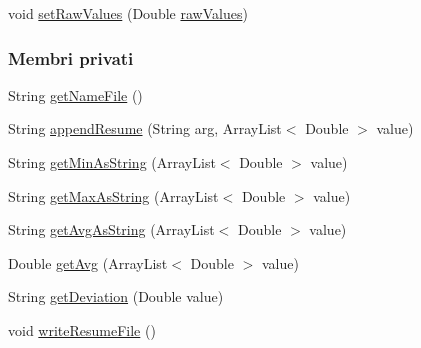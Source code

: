 \begin{DoxyCompactItemize}
\item 
void \hyperlink{classit_1_1unibo_1_1torsello_1_1bluetoothpositioning_1_1util_1_1ReportUtils_a6a65fe55f37edba3871801600cdf48f4_a6a65fe55f37edba3871801600cdf48f4}{set\+Raw\+Values} (Double \hyperlink{classit_1_1unibo_1_1torsello_1_1bluetoothpositioning_1_1util_1_1ReportUtils_adbe56bea0813a48932ef94b8b27c3314_adbe56bea0813a48932ef94b8b27c3314}{raw\+Values})
\end{DoxyCompactItemize}
\subsubsection*{Membri privati}
\begin{DoxyCompactItemize}
\item 
String \hyperlink{classit_1_1unibo_1_1torsello_1_1bluetoothpositioning_1_1util_1_1ReportUtils_a0f5823e8ff4bd5e3accc20a7313b075f_a0f5823e8ff4bd5e3accc20a7313b075f}{get\+Name\+File} ()
\item 
String \hyperlink{classit_1_1unibo_1_1torsello_1_1bluetoothpositioning_1_1util_1_1ReportUtils_ac57226bb543cd32d89c205a41ff23ae3_ac57226bb543cd32d89c205a41ff23ae3}{append\+Resume} (String arg, Array\+List$<$ Double $>$ value)
\item 
String \hyperlink{classit_1_1unibo_1_1torsello_1_1bluetoothpositioning_1_1util_1_1ReportUtils_ad44a97d58ebf0e48fc15b573be05eae9_ad44a97d58ebf0e48fc15b573be05eae9}{get\+Min\+As\+String} (Array\+List$<$ Double $>$ value)
\item 
String \hyperlink{classit_1_1unibo_1_1torsello_1_1bluetoothpositioning_1_1util_1_1ReportUtils_ada05f889f861205ac0687db4442cad63_ada05f889f861205ac0687db4442cad63}{get\+Max\+As\+String} (Array\+List$<$ Double $>$ value)
\item 
String \hyperlink{classit_1_1unibo_1_1torsello_1_1bluetoothpositioning_1_1util_1_1ReportUtils_a174ea1d2c8b7e5effd484c65d1b5488c_a174ea1d2c8b7e5effd484c65d1b5488c}{get\+Avg\+As\+String} (Array\+List$<$ Double $>$ value)
\item 
Double \hyperlink{classit_1_1unibo_1_1torsello_1_1bluetoothpositioning_1_1util_1_1ReportUtils_a4efc733750ef3ab7dddb613291bff1c4_a4efc733750ef3ab7dddb613291bff1c4}{get\+Avg} (Array\+List$<$ Double $>$ value)
\item 
String \hyperlink{classit_1_1unibo_1_1torsello_1_1bluetoothpositioning_1_1util_1_1ReportUtils_af24755a01c03201bca86e0c2e03cf81d_af24755a01c03201bca86e0c2e03cf81d}{get\+Deviation} (Double value)
\item 
void \hyperlink{classit_1_1unibo_1_1torsello_1_1bluetoothpositioning_1_1util_1_1ReportUtils_af8578f11822b403410e46f023b68dd7b_af8578f11822b403410e46f023b68dd7b}{write\+Resume\+File} ()

\end{DoxyCompactItemize}
